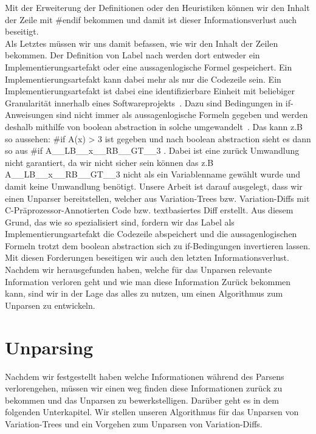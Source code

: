 Mit der Erweiterung der Definitionen oder den Heuristiken können wir den Inhalt der Zeile mit \#endif bekommen und damit ist dieser Informationsverlust auch beseitigt.\\

Als Letztes müssen wir uns damit befassen, wie wir den Inhalt der Zeilen bekommen. Der Definition von Label nach werden dort entweder ein Implementierungsartefakt oder eine aussagenlogische Formel gespeichert. Ein Implementierungsartefakt kann dabei mehr als nur die Codezeile sein. Ein Implementierungsartefakt ist dabei  eine identifizierbare Einheit mit beliebiger Granularität innerhalb eines Softwareprojekts~\cite{BTS+:ESECFSE22}. Dazu sind Bedingungen in if-Anweisungen sind nicht immer als aussagenlogische Formeln gegeben und werden deshalb mithilfe von boolean abstraction in solche umgewandelt~\cite{BTS+:ESECFSE22}. Das kann z.B so aussehen: \#if A(x) > 3 ist gegeben und nach boolean abstraction sieht es dann so aus \#if A\_\_LB\_\_x\_\_RB\_\_GT\_\_3 . Dabei ist eine zurück Umwandlung nicht garantiert, da wir nicht sicher sein können das z.B  A\_\_LB\_\_x\_\_RB\_\_GT\_\_3 nicht als ein Variablenname gewählt wurde und damit keine Umwandlung benötigt. Unsere Arbeit ist darauf ausgelegt, dass wir einen Unparser bereitstellen, welcher aus Variation-Trees bzw. Variation-Diffs mit C-Präprozessor-Annotierten Code bzw. textbasiertes Diff erstellt. Aus diesem Grund, das wie so spezialisiert sind, fordern wir das Label als Implementierungsartefakt die Codezeile abspeichert und die aussagenlogischen Formeln trotzt dem boolean abstraction sich zu if-Bedingungen invertieren lassen. Mit diesen Forderungen beseitigen wir auch den letzten Informationsverlust.\\

Nachdem wir herausgefunden haben, welche für das Unparsen relevante Information verloren geht und wie man diese Information Zurück bekommen kann, sind wir in der Lage das alles zu nutzen, um einen Algorithmus zum Unparsen zu entwickeln.


\section{Unparsing}



Nachdem wir festgestellt haben welche Informationen während des Parsens verlorengehen, müssen wir einen weg finden diese Informationen zurück zu bekommen und das Unparsen zu bewerkstelligen. Darüber geht es in dem folgenden Unterkapitel. Wir stellen unseren Algorithmus für das Unparsen von Variation-Trees und ein Vorgehen zum Unparsen von Variation-Diffs.\\

